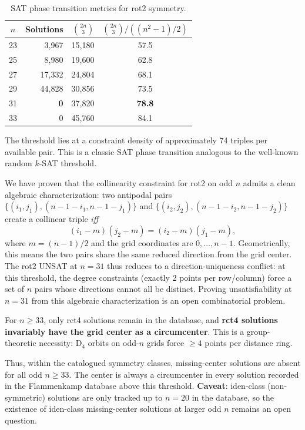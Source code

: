 \documentclass[11pt,a4paper]{article}
\theoremstyle{plain}
\theoremstyle{definition}
\begin{document}
\begin{table}[H]
\centering
\caption{SAT phase transition metrics for rot2 symmetry.}
\label{tab:rot2transition}
\begin{tabular}{crrc}
\toprule
$n$ & Solutions & $\binom{2n}{3}$ & $\binom{2n}{3} / ((n^2-1)/2)$ \\
\midrule
23 & 3,967 & 15,180 & 57.5 \\
25 & 8,980 & 19,600 & 62.8 \\
27 & 17,332 & 24,804 & 68.1 \\
29 & 44,828 & 30,856 & 73.5 \\
31 & \textbf{0} & 37,820 & \textbf{78.8} \\
33 & 0 & 45,760 & 84.1 \\
\bottomrule
\end{tabular}
\end{table}

The threshold lies at a constraint density of approximately 74 triples per available pair. This is a classic SAT phase transition analogous to the well-known random $k$-SAT threshold. 

We have proven that the collinearity constraint for rot2 on odd $n$ admits a clean algebraic characterization: two antipodal pairs $\{(i_1,j_1),(n-1-i_1,n-1-j_1)\}$ and $\{(i_2,j_2),(n-1-i_2,n-1-j_2)\}$ create a collinear triple \emph{iff}
\[
(i_1-m)(j_2-m) = (i_2-m)(j_1-m),
\]
where $m=(n-1)/2$ and the grid coordinates are $0,\dots,n-1$. Geometrically, this means the two pairs share the same reduced direction from the grid center. The rot2 UNSAT at $n=31$ thus reduces to a direction-uniqueness conflict: at this threshold, the degree constraints (exactly 2 points per row/column) force a set of $n$ pairs whose directions cannot all be distinct. Proving unsatisfiability at $n=31$ from this algebraic characterization is an open combinatorial problem.

For $n\ge 33$, only rct4 solutions remain in the database, and \textbf{rct4 solutions invariably have the grid center as a circumcenter}. This is a group-theoretic necessity: D$_4$ orbits on odd-$n$ grids force $\ge 4$ points per distance ring.

Thus, within the catalogued symmetry classes, missing-center solutions are absent for all odd $n\ge 33$. The center is always a circumcenter in every solution recorded in the Flammenkamp database above this threshold. \textbf{Caveat}: iden-class (non-symmetric) solutions are only tracked up to $n=20$ in the database, so the existence of iden-class missing-center solutions at larger odd $n$ remains an open question.
\end{document}

